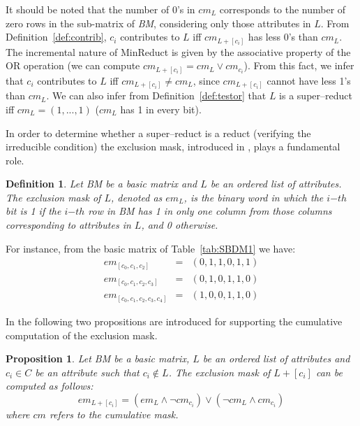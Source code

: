 \documentclass[authoryear,preprint,review,12pt]{elsarticle}
\newtheorem{proposition}{Proposition}
\newtheorem{definition}{Definition}
\begin{document}
	It should be noted that the number of 0's in $cm_L$ corresponds to the number of zero rows in the sub-matrix of \textit{BM}, considering only those attributes in $L$. From Definition~\ref{def:contrib}, $c_i$ contributes to $L$ iff $cm_{L+[c_i]}$ has less 0's than $cm_L$. The incremental nature of MinReduct is given by the associative property of the OR operation (we can compute $cm_{L+[c_i]}=cm_L\vee cm_{c_i}$). From this fact, we infer that $c_i$ contributes to $L$ iff $cm_{L+[c_i]}\neq cm_L$, since $cm_{L+[c_i]}$ cannot have less 1's than $cm_L$. We can also infer from Definition~\ref{def:testor} that $L$ is a super--reduct iff $cm_L=(1,...,1)$ ($cm_L$ has 1 in every bit).
	
	In order to determine whether a super--reduct is a reduct (verifying the irreducible condition) the
	exclusion mask, introduced in \citep{Lias09}, plays a fundamental role. 
	
	\begin{definition}\label{def:exclusion}
		Let BM be a basic matrix and $L$ be an ordered list of attributes. The exclusion mask of $L$, denoted as $em_L$, is the binary word in which the $i{\mathit{-th}}$ bit is 1 if the $i{\mathit{-th}}$ row in BM has 1 in only one column from those columns corresponding to attributes in $L$, and 0 otherwise.
	\end{definition}
	
	For instance, from the basic matrix of Table~\ref{tab:SBDM1} we have:
	$$\begin{array}{lcc}
	  em_{[ c_0,c_1,c_2]}         &=& (0,1,1,0,1,1)\\
	  em_{[ c_0,c_1,c_2,c_3]}     &=& (0,1,0,1,1,0)\\
	  em_{[ c_0,c_1,c_2,c_3,c_4]} &=& (1,0,0,1,1,0)
	\end{array}$$
	
	In \citep{Lias13} the following two propositions are introduced for supporting the cumulative computation of the exclusion mask.
	
	\begin{proposition}\label{prop:cumul} 
		Let BM be a basic matrix, $L$ be an ordered list of attributes and $c_i \in C$ be an attribute such that $c_i \notin L$. The exclusion mask of $L+[c_i]$ can be computed as follows: $$em_{L+[c_i]}=(em_L \wedge \neg cm_{c_i}) \vee (\neg cm_L \wedge cm_{c_i})$$ where $cm$ refers to the cumulative mask.
	\end{proposition}
	
	
\end{document}
